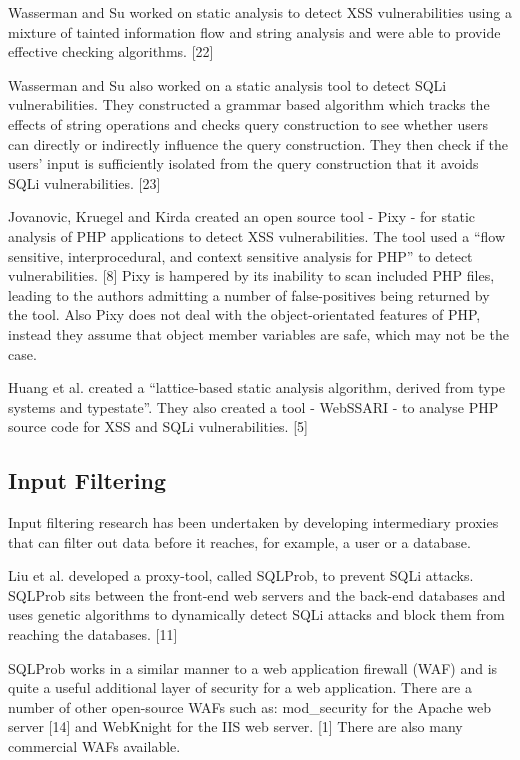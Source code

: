 \documentclass[12pt,a4paper]{article}
\begin{document}
Wasserman and Su worked on static analysis to detect XSS vulnerabilities using a mixture of tainted information flow and  string analysis and were able to provide effective checking algorithms. [22]

Wasserman and Su also worked on a static analysis tool to detect SQLi vulnerabilities.  They constructed a grammar based algorithm which tracks the effects of string operations and checks query construction to see whether users can directly or indirectly influence the query construction.   They then check if the users’ input is sufficiently  isolated from the query construction that it avoids SQLi vulnerabilities. [23]

Jovanovic, Kruegel and  Kirda created an open source tool - Pixy - for static analysis of PHP applications to detect XSS vulnerabilities.  The tool used a “flow sensitive, interprocedural, and context sensitive analysis for PHP” to detect vulnerabilities. [8]  Pixy is hampered by its inability to scan included PHP files, leading to the authors admitting a number of false-positives being returned by the tool.  Also Pixy does not deal with the object-orientated features of PHP, instead they assume that object member variables are safe, which may not be the case.

Huang et al. created a “lattice-based static analysis algorithm, derived from type systems and typestate”.  They also created a tool - WebSSARI - to analyse PHP source code for XSS and SQLi vulnerabilities. [5]

\subsection{Input Filtering}
Input filtering research has been undertaken by developing intermediary proxies that can filter out data before it reaches, for example, a user or a database.

Liu et al. developed  a proxy-tool, called SQLProb, to prevent SQLi attacks.  SQLProb sits between the front-end web servers and the back-end databases and uses genetic algorithms to dynamically detect SQLi attacks and block them from reaching the databases. [11]

SQLProb works in a similar manner to a web application firewall (WAF) and is quite a useful additional layer of security for a web application.  There are a number of other open-source WAFs such as: mod\_security for the Apache web server [14] and WebKnight for the IIS web server. [1]  There are also many commercial WAFs available.
\end{document}
